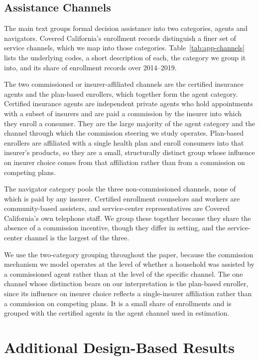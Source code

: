 \documentclass[12pt]{article}
\begin{document}
\subsection{Assistance Channels}
\label{app:channels}

The main text groups formal decision assistance into two categories, agents and navigators. Covered California's enrollment records distinguish a finer set of service channels, which we map into those categories. Table~\ref{tab:app-channels} lists the underlying codes, a short description of each, the category we group it into, and its share of enrollment records over 2014--2019.

The two commissioned or insurer-affiliated channels are the certified insurance agents and the plan-based enrollers, which together form the agent category. Certified insurance agents are independent private agents who hold appointments with a subset of insurers and are paid a commission by the insurer into which they enroll a consumer. They are the large majority of the agent category and the channel through which the commission steering we study operates. Plan-based enrollers are affiliated with a single health plan and enroll consumers into that insurer's products, so they are a small, structurally distinct group whose influence on insurer choice comes from that affiliation rather than from a commission on competing plans.

The navigator category pools the three non-commissioned channels, none of which is paid by any insurer. Certified enrollment counselors and workers are community-based assisters, and service-center representatives are Covered California's own telephone staff. We group these together because they share the absence of a commission incentive, though they differ in setting, and the service-center channel is the largest of the three.

We use the two-category grouping throughout the paper, because the commission mechanism we model operates at the level of whether a household was assisted by a commissioned agent rather than at the level of the specific channel. The one channel whose distinction bears on our interpretation is the plan-based enroller, since its influence on insurer choice reflects a single-insurer affiliation rather than a commission on competing plans. It is a small share of enrollments and is grouped with the certified agents in the agent channel used in estimation.


\section{Additional Design-Based Results}
\label{app:reduced_form}
\end{document}
